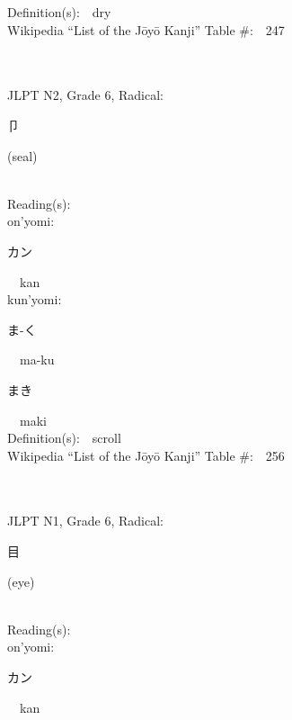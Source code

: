 \begin{multicols}{2}
Definition(s):\ \ dry \\
Wikipedia ``List of the J\=oy\=o Kanji'' Table \#:\ \ 247 \\
\ \ \\
{\fontsize{34pt}{40pt}  }\ \ \\  %
{JLPT N2, Grade 6, Radical:\ \ {\begin{CJK}{UTF8}{min} 卩 \end{CJK}} (seal) } \\
Reading(s):\ \ \\
{\hspace*{1em}}on'yomi:\ \ \\
{\hspace*{2em}}{\begin{CJK}{UTF8}{min} カン \end{CJK}}\ \ kan\ \ \\
{\hspace*{1em}}kun'yomi:\ \ \\
{\hspace*{2em}}{\begin{CJK}{UTF8}{min} ま-く \end{CJK}}\ \ ma-ku\ \ \\
{\hspace*{2em}}{\begin{CJK}{UTF8}{min} まき \end{CJK}}\ \ maki\ \ \\
Definition(s):\ \ scroll \\
Wikipedia ``List of the J\=oy\=o Kanji'' Table \#:\ \ 256 \\
\ \ \\
{\fontsize{34pt}{40pt}  }\ \ \\  %
{JLPT N1, Grade 6, Radical:\ \ {\begin{CJK}{UTF8}{min} 目 \end{CJK}} (eye) } \\
Reading(s):\ \ \\
{\hspace*{1em}}on'yomi:\ \ \\
{\hspace*{2em}}{\begin{CJK}{UTF8}{min} カン \end{CJK}}\ \ kan\ \ \\

\end{multicols}
